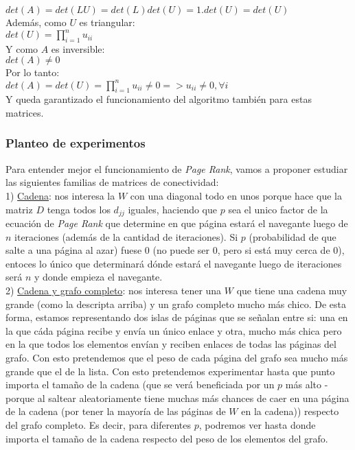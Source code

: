 				$det(A) = det(LU) = det(L)det(U) = 1.det(U) = det(U)$ \\

				Además, como $U$ es triangular: \\

				$det(U) = \prod_{i=1}^{n} u_{ii}$ \\

				Y como $A$ es inversible: \\

				$det(A) \neq 0$ \\

				Por lo tanto: \\

				$det(A) = det(U) = \prod_{i=1}^{n} u_{ii} \neq 0 => u_{ii} \neq 0, \forall i$ \\

				Y queda garantizado el funcionamiento del algoritmo también para estas matrices. \\

		\subsubsection{Planteo de experimentos}

			Para entender mejor el funcionamiento de \textit{Page Rank}, vamos a proponer estudiar las siguientes familias de matrices de conectividad:\\

			1) \underline{Cadena}: nos interesa la $W$ con una diagonal todo en unos porque hace que la matriz $D$ tenga todos los $d_{jj}$ iguales, haciendo que $p$ sea el unico factor de la ecuación de \textit{Page Rank} que determine en que página estará el navegante luego de $n$ iteraciones (además de la cantidad de iteraciones). Si $p$ (probabilidad de que salte a una página al azar) fuese $0$ (no puede ser $0$, pero si está muy cerca de $0$), entoces lo único que determinará dónde estará el navegante luego de iteraciones será $n$ y donde empieza el navegante. \\

			2) \underline{Cadena y grafo completo}: nos interesa tener una $W$ que tiene una cadena muy grande (como la descripta arriba) y un grafo completo mucho más chico. De esta forma, estamos representando dos islas de páginas que se señalan entre si: una en la que cáda página recibe y envía un único enlace y otra, mucho más chica pero en la que todos los elementos envían y reciben enlaces de todas las páginas del grafo. Con esto pretendemos que el peso de cada página del grafo sea mucho más grande que el de la lista. Con esto pretendemos experimentar hasta que punto importa el tamaño de la cadena (que se verá beneficiada por un $p$ más alto -porque al saltear aleatoriamente tiene muchas más chances de caer en una página de la cadena (por tener la mayoría de las páginas de $W$ en la cadena)) respecto del grafo completo. Es decir, para diferentes $p$, podremos ver hasta donde importa el tamaño de la cadena respecto del peso de los elementos del grafo. \\


